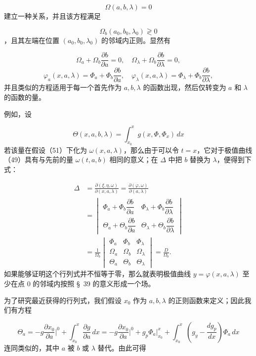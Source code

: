 \documentclass[11pt,a4paper,leqno]{article}
\begin{document}
\begin{equation}\tag{51}
\Omega(a,b,\lambda)=0
\end{equation}
建立一种关系，并且该方程满足

\begin{equation}\tag{52}
\Omega_b(a_0,b_0,\lambda_0)\gtrless 0
\end{equation}
，且其左端在位置 $(a_0,b_0,\lambda_0)$ 的邻域内正则。显然有

\[
\Omega_a+\Omega_b\frac{\partial b}{\partial a}=0,
\quad
\Omega_\lambda+\Omega_b\frac{\partial b}{\partial \lambda}=0,
\]
\[
\varphi_a(x,a,\lambda)=\Phi_a+\Phi_b\frac{\partial b}{\partial a},
\quad
\varphi_\lambda(x,a,\lambda)=\Phi_\lambda+\Phi_b\frac{\partial b}{\partial\lambda},
\]
并且类似的方程适用于每一个首先作为 $a,b,\lambda$ 的函数出现，然后仅转变为 $a$ 和 $\lambda$ 的函数的量。

例如，设

\[
\Theta(x,a,b,\lambda)=\int_{x_0}^{x}g(x,\Phi,\Phi_x)\,dx
\]
若该量在假设（51）下化为 $\omega(x,a,\lambda)$，那么由于可以令 $t=x$，它对于极值曲线（49）具有与先前的量 $\omega(t,a,b)$ 相同的意义；在 $\Delta$ 中把 $b$ 替换为 $\lambda$，便得到下式：

\[
\begin{aligned}
\Delta&=\frac{\partial(\xi,\eta,\omega)}{\partial(x,a,\lambda)}
=\frac{\partial(\varphi,\omega)}{\partial(a,\lambda)} \\
&=\begin{vmatrix}
\Phi_a+\Phi_b\dfrac{\partial b}{\partial a}&\Phi_\lambda+\Phi_b\dfrac{\partial b}{\partial\lambda}\\[1.0ex]
\Theta_a+\Theta_b\dfrac{\partial b}{\partial a}&\Theta_\lambda+\Theta_b\dfrac{\partial b}{\partial\lambda}
\end{vmatrix}\\
&=\frac{1}{\Omega_b}\begin{vmatrix}
\Phi_a&\Phi_b&\Phi_\lambda\\
\Omega_a&\Omega_b&\Omega_\lambda\\
\Theta_a&\Theta_b&\Theta_\lambda
\end{vmatrix}=\frac{D}{\Omega_b}.
\end{aligned}
\]
如果能够证明这个行列式并不恒等于零，那么就表明极值曲线 $y=\varphi(x,a,\lambda)$ 至少在点 0 的邻域内按照 \S~39 的意义形成一个场。

为了研究最近获得的行列式，我们假设 $x_0$ 作为 $a,b,\lambda$ 的正则函数来定义；因此我们有方程

\[
\Theta_a=-g\frac{\partial x_0}{\partial a}\bigg|^0+\int_{x_0}^{x}\frac{\partial g}{\partial a}\,dx
=-g\frac{\partial x_0}{\partial a}\bigg|^0+g_p\Phi_a\bigg|_{x_0}^{x}+\int_{x_0}^{x}\left(g_y-\frac{dg_p}{dx}\right)\Phi_a\,dx
\]
连同类似的，其中 $a$ 被 $b$ 或 $\lambda$ 替代。由此可得
\end{document}
